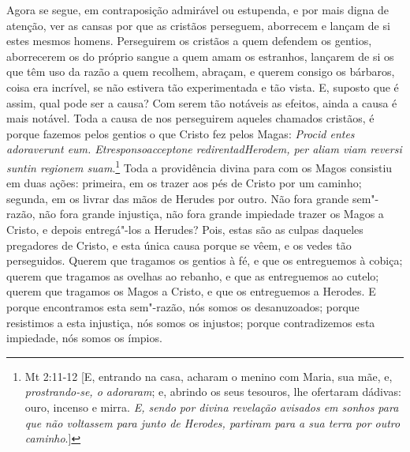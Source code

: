 Agora se segue, em contraposição admirável ou estupenda, e por mais
digna de atenção, ver as cansas por que as cristãos perseguem,
aborrecem e lançam de si estes mesmos homens. Perseguirem os cristãos a
quem defendem os gentios, aborrecerem os do próprio sangue a quem amam
os estranhos, lançarem de si os que têm uso da razão a quem recolhem,
abraçam, e querem consigo os bárbaros, coisa era incrível, se não
estivera tão experimentada e tão vista. E, suposto que é assim, qual
pode ser a causa? Com serem tão notáveis as efeitos, ainda a causa é
mais notável. Toda a causa de nos perseguirem aqueles chamados cristãos,
é porque fazemos pelos gentios o que Cristo fez pelos Magas:
\emph{Procid entes adoraverunt eum. Etresponsoacceptone
redirentadHerodem, per aliam viam reversi suntin regionem suam}.\footnote{Mt 2:11-12 [E, entrando na casa, acharam o menino com Maria, sua mãe, e, \emph{prostrando-se, o
adoraram}; e, abrindo os seus tesouros, lhe ofertaram dádivas: ouro, incenso e mirra. \emph{E, sendo por divina revelação avisados em sonhos para que não voltassem para junto de Herodes, partiram para a sua terra por outro caminho}.]}
Toda a providência divina para com os Magos consistiu em
duas ações: primeira, em os trazer aos pés de Cristo por um caminho;
segunda, em os livrar das mãos de Herudes por outro. Não fora grande
sem"-razão, não fora grande injustiça, não fora grande impiedade trazer
os Magos a Cristo, e depois entregá"-los a Herudes? Pois, estas são as
culpas daqueles pregadores de Cristo, e esta única causa porque se vêem,
e os vedes tão perseguidos. Querem que tragamos os gentios à fé, e que
os entreguemos à cobiça; querem que tragamos as ovelhas ao rebanho, e
que as entreguemos ao cutelo; querem que tragamos os Magos a Cristo, e
que os entreguemos a Herodes. E porque encontramos esta sem"-razão, nós
somos os desanuzoados; porque resistimos a esta injustiça, nós somos os
injustos; porque contradizemos esta impiedade, nós somos os ímpios.

